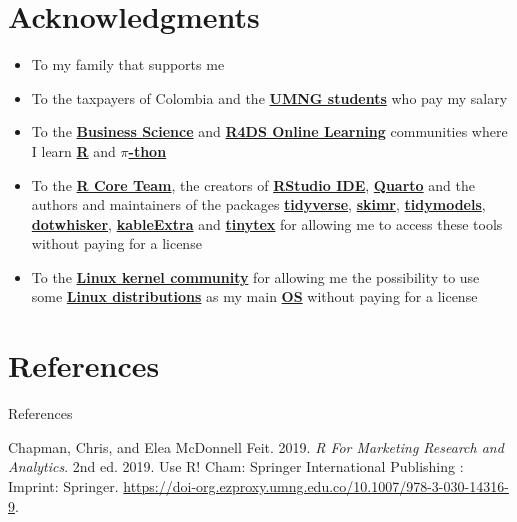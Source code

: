 \documentclass[
  ignorenonframetext,
]{beamer}
\newlength{\cslhangindent}
\newenvironment{CSLReferences}[2] %
 {\begin{list}{}{%
  \setlength{\itemindent}{0pt}
  \setlength{\leftmargin}{0pt}
  \setlength{\parsep}{0pt}
  \ifodd #1
   \setlength{\leftmargin}{\cslhangindent}
   \setlength{\itemindent}{-1\cslhangindent}
  \fi
  \setlength{\itemsep}{#2\baselineskip}}}
 {\end{list}}
\begin{document}
\section{Acknowledgments}\label{acknowledgments}

\begin{frame}{}
\label{section-43}
\begin{itemize}
\item
  To my family that supports me
\item
  To the taxpayers of Colombia and the
  \href{https://www.umng.edu.co/estudiante}{\textbf{UMNG students}} who
  pay my salary
\item
  To the \href{https://www.business-science.io/}{\textbf{Business
  Science}} and \href{https://www.rfordatasci.com/}{\textbf{R4DS Online
  Learning}} communities where I learn
  \href{https://www.r-project.org/about.html}{\textbf{R}} and
  \href{https://www.python.org/about/}{\textbf{\(\pi\)-thon}}
\item
  To the \href{https://www.r-project.org/contributors.html}{\textbf{R
  Core Team}}, the creators of
  \href{https://posit.co/products/open-source/rstudio/}{\textbf{RStudio
  IDE}}, \href{https://quarto.org/}{\textbf{Quarto}} and the authors and
  maintainers of the packages
  \href{https://CRAN.R-project.org/package=tidyverse}{\textbf{tidyverse}},
  \href{https://CRAN.R-project.org/package=skimr}{\textbf{skimr}},
  \href{https://CRAN.R-project.org/package=tidymodels}{\textbf{tidymodels}},
  \href{https://CRAN.R-project.org/package=dotwhisker}{\textbf{dotwhisker}},
  \href{https://CRAN.R-project.org/package=kableExtra}{\textbf{kableExtra}}
  and
  \href{https://CRAN.R-project.org/package=tinytex}{\textbf{tinytex}}
  for allowing me to access these tools without paying for a license
\item
  To the \href{https://www.kernel.org/category/about.html}{\textbf{Linux
  kernel community}} for allowing me the possibility to use some
  \href{https://static.lwn.net/Distributions/}{\textbf{Linux
  distributions}} as my main
  \href{https://en.wikipedia.org/wiki/Operating_system}{\textbf{OS}}
  without paying for a license
\end{itemize}
\end{frame}

\section*{References}\label{references}

\begin{frame}[allowframebreaks]{References}
\label{refs}
\begin{CSLReferences}{1}{0}
Chapman, Chris, and Elea McDonnell Feit. 2019. \emph{R {For} {Marketing}
{Research} and {Analytics}}. 2nd ed. 2019. Use {R}! Cham: Springer
International Publishing : Imprint: Springer.
\url{https://doi-org.ezproxy.umng.edu.co/10.1007/978-3-030-14316-9}.

\end{CSLReferences}
\end{frame}
\end{document}
